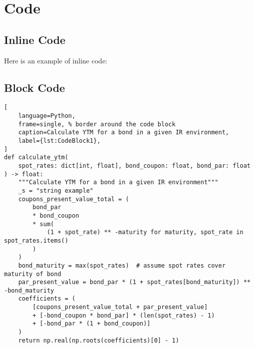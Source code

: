 \section{Code}

\subsection{Inline Code}

Here is an example of inline code:

\subsection{Block Code}

\begin{minipage}{\linewidth}
\begin{lstlisting}[
    language=Python,
    frame=single, % border around the code block
    caption=Calculate YTM for a bond in a given IR environment,
    label={lst:CodeBlock1},
]
def calculate_ytm(
    spot_rates: dict[int, float], bond_coupon: float, bond_par: float
) -> float:
    """Calculate YTM for a bond in a given IR environment"""
    _s = "string example"
    coupons_present_value_total = (
        bond_par
        * bond_coupon
        * sum(
            (1 + spot_rate) ** -maturity for maturity, spot_rate in spot_rates.items()
        )
    )
    bond_maturity = max(spot_rates)  # assume spot rates cover maturity of bond
    par_present_value = bond_par * (1 + spot_rates[bond_maturity]) ** -bond_maturity
    coefficients = (
        [coupons_present_value_total + par_present_value]
        + [-bond_coupon * bond_par] * (len(spot_rates) - 1)
        + [-bond_par * (1 + bond_coupon)]
    )
    return np.real(np.roots(coefficients)[0] - 1)
\end{lstlisting}
\end{minipage}

